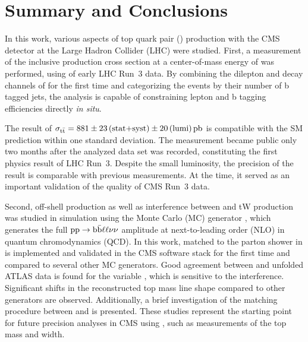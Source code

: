 \chapter{Summary and Conclusions}
\label{ch:summary}


In this work, various aspects of top quark pair (\ttbar) production with the CMS detector at the Large Hadron Collider (LHC) were studied. First, a measurement of the inclusive \ttbar production cross section at a center-of-mass energy of \sqrtsRIII was performed, using \lumiRIII of early LHC Run~3 data. By combining the dilepton and \ljets decay channels of \ttbar for the first time and categorizing the events by their number of b tagged jets, the analysis is capable of constraining lepton and b tagging efficiencies directly \textit{in situ}. 

The result of $\sigma_{\mathrm{t \bar{t}}} = 881 \pm 23 \, \text{(stat+syst)} \pm 20 \, \text{(lumi)} \, \text{pb}$ is compatible with the SM prediction within one standard deviation. The measurement became public only two months after the analyzed data set was recorded, constituting the first physics result of LHC Run~3. Despite the small luminosity, the precision of the result is comparable with previous \sigmatt measurements. At the time, it served as an important validation of the quality of CMS Run~3 data.


\smallskip

Second, off-shell \ttbar production as well as interference between \ttbar and tW production was studied in simulation using the Monte Carlo (MC) generator \bbfourl, which generates the full $\mathrm{pp} \rightarrow \mathrm{b \bar{b}} \ell \ell \nu \nu$ amplitude at next-to-leading order (NLO) in quantum chromodynamics (QCD). %
In this work, \bbfourl matched to the parton shower in \pythia is implemented and validated in the CMS software stack for the first time and compared to several other \ttbar MC generators. Good agreement between \bbfourl and unfolded ATLAS data is found for the variable \mblminimax, which is sensitive to the \tttW interference. Significant shifts in the reconstructed top mass line shape compared to other generators are observed. Additionally, a brief investigation of the matching procedure between \bbfourl and \pythia is presented. These studies represent the starting point for future precision \ttbar analyses in CMS using \bbfourl, such as measurements of the top mass and width.

